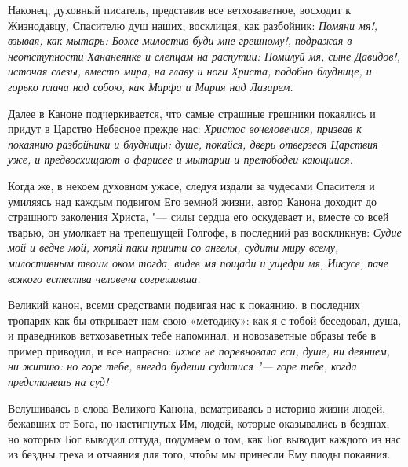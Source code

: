 Наконец, духовный писатель, представив все
ветхозаветное, восходит к Жизнодавцу, Спасителю
душ наших, восклицая, как разбойник: \itshape Помяни мя!\normalfont{},
взывая, как мытарь: \itshape Боже милостив буди мне
грешному!\normalfont{}, подражая в неотступности Хананеянке
и слепцам на распутии: \itshape Помилуй мя, сыне Давидов!\normalfont{},
источая слезы, вместо мира, на главу и ноги
Христа, подобно блуднице, и горько плача над
собою, как Марфа и Мария над Лазарем. 


Далее в Каноне подчеркивается, что самые
страшные грешники покаялись и придут в Царство
Небесное прежде нас: \itshape Христос вочеловечися,
призвав к покаянию разбойники и блудницы: душе,
покайся, дверь отверзеся Царствия уже, и
предвосхищают о фарисее и мытарии и прелюбодеи
кающиися.\normalfont{} 


Когда же, в некоем духовном ужасе, следуя издали
за чудесами Спасителя и умиляясь над каждым
подвигом Его земной жизни, автор Канона доходит
до страшного заколения Христа, "--- силы сердца его
оскудевает и, вместе со всей тварью, он умолкает
на трепещущей Голгофе, в последний раз
воскликнув: \itshape Судие мой и ведче мой, хотяй паки
приити со ангелы, судити миру всему, милостивным
твоим оком тогда, видев мя пощади и ущедри мя,
Иисусе, паче всякого естества человеча
согрешивша.\normalfont{}


Великий канон, всеми средствами подвигая нас к
покаянию, в последних тропарях как бы открывает
нам свою «методику»: как я с тобой беседовал,
душа, и праведников ветхозаветных тебе
напоминал, и новозаветные образы тебе в пример
приводил, и все напрасно: \itshape ихже не поревновала
еси, душе, ни деянием, ни житию: но горе тебе,
внегда будеши судитися\normalfont{} "--- горе тебе, когда
предстанешь на суд! 


Вслушиваясь в слова Великого Канона,
всматриваясь в историю жизни людей, бежавших от
Бога, но настигнутых Им, людей, которые
оказывались в безднах, но которых Бог выводил
оттуда, подумаем о том, как Бог выводит каждого из
нас из бездны греха и отчаяния для того, чтобы мы
принесли Ему плоды покаяния.


